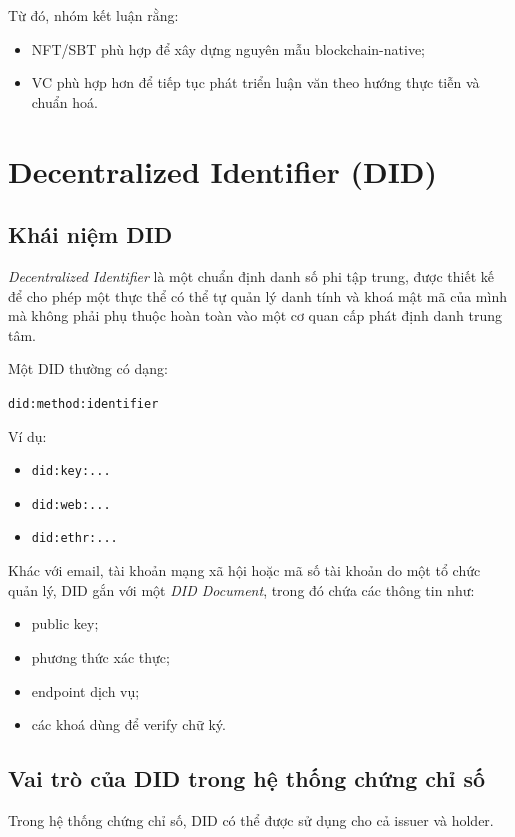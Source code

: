 Từ đó, nhóm kết luận rằng:
\begin{itemize}
    \item NFT/SBT phù hợp để xây dựng nguyên mẫu blockchain-native;
    \item VC phù hợp hơn để tiếp tục phát triển luận văn theo hướng thực tiễn và chuẩn hoá.
\end{itemize}

\section{Decentralized Identifier (DID)}

\subsection{Khái niệm DID}

\textit{Decentralized Identifier} là một chuẩn định danh số phi tập trung, được thiết kế để cho phép một thực thể có thể tự quản lý danh tính và khoá mật mã của mình mà không phải phụ thuộc hoàn toàn vào một cơ quan cấp phát định danh trung tâm.

Một DID thường có dạng:
\begin{center}
\texttt{did:method:identifier}
\end{center}

Ví dụ:
\begin{itemize}
    \item \texttt{did:key:...}
    \item \texttt{did:web:...}
    \item \texttt{did:ethr:...}
\end{itemize}

Khác với email, tài khoản mạng xã hội hoặc mã số tài khoản do một tổ chức quản lý, DID gắn với một \textit{DID Document}, trong đó chứa các thông tin như:
\begin{itemize}
    \item public key;
    \item phương thức xác thực;
    \item endpoint dịch vụ;
    \item các khoá dùng để verify chữ ký.
\end{itemize}

\subsection{Vai trò của DID trong hệ thống chứng chỉ số}

Trong hệ thống chứng chỉ số, DID có thể được sử dụng cho cả issuer và holder.

